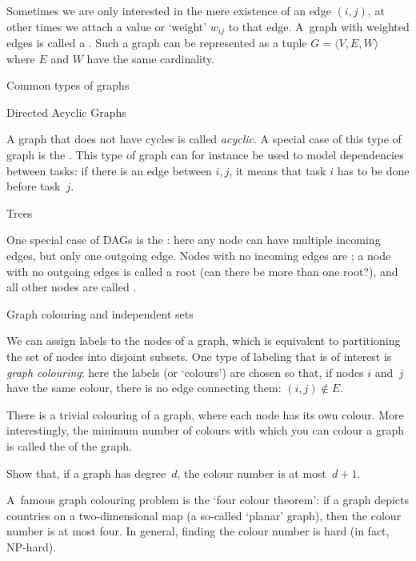 Sometimes we are only interested in the mere existence of an edge
$(i,j)$, at other times we attach a value or `weight' $w_{ij}$ to that
edge. A~graph with weighted edges is called a . Such a graph can be represented as a tuple $G=\langle
V,E,W\rangle$ where $E$ and $W$ have the same cardinality.

 {Common types of graphs}

 {Directed Acyclic Graphs}

A graph that does not have cycles is called
\emph{acyclic}. A special case of this type of
graph is the . This type of graph can for instance be
used to model dependencies between tasks: if there is an edge between
$i,j$, it means that task $i$ has to be done before task~$j$.

 {Trees}

One special case of \acp{DAG} is the : here any
node can have multiple incoming edges, but only one outgoing
edge. Nodes with no incoming edges are ; a node
with no outgoing edges is called a root (can there be more than one
root?), and all other nodes are called .

 {Graph colouring and independent sets}
\label{sec:independent}

We can assign labels to the nodes of a graph, which is equivalent to
partitioning the set of nodes into disjoint subsets. One type of
labeling that is of interest is \emph{graph colouring}: here the
labels (or `colours') are chosen so that, if nodes $i$ and~$j$ have
the same colour, there is no edge connecting them: $(i,j)\not\in
E$. 

There is a trivial colouring of a graph, where each node has its own
colour. More interestingly,
the minimum number of colours with which you can colour a graph is
called the  of the graph.

\begin{exercise}
  Show that, if a graph has degree~$d$, the colour number is at
  most~$d+1$.
\end{exercise}

A~famous graph colouring problem is the `four colour theorem': if
a graph depicts countries on a two-dimensional map (a so-called
`planar' graph), then the colour number is at most four.
In general, finding the colour number is hard (in fact, NP-hard).

